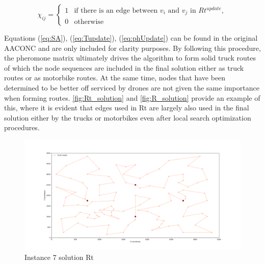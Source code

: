 \documentclass{article}
\begin{document}
	\begin{equation}
		\chi_{ij} = 
		\begin{cases}
			1 & \text{if there is an edge between }v_i \text{ and }v_j \text{ in }Rt^{update},\\
			0 & \text{otherwise}
		\end{cases}
		\label{eq:diff}
	\end{equation}

	Equations (\ref{eq:SA}), (\ref{eq:Tupdate}), (\ref{eq:phUpdate}) can be found in the original AACONC and are only included for clarity purposes. By following this procedure, the pheromone matrix ultimately drives the algorithm to form solid truck routes of which the node sequences are included in the final solution either as truck routes or as motorbike routes. At the same time, nodes that have been determined to be better off serviced by drones are not given the same importance when forming routes. \autoref{fig:Rt_solution} and \ref{fig:R_solution} provide an example of this, where it is evident that edges used in Rt are largely also used in the final solution either by the trucks or motorbikes even after local search optimization procedures.
	\begin{figure}[h]
		\centering
		\begin{minipage}{\columnwidth}
			\centering
			\includegraphics[scale=0.2]{p07-15-15-15_best_solution_TRUCK}\;
			\caption{Instance 7 solution Rt}
			\label{fig:Rt_solution}
		\end{minipage}
	\end{figure}
\end{document}
